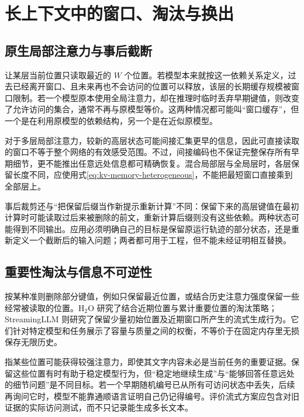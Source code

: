 \documentclass[UTF8,12pt,a4paper,fontset=fandol]{ctexart}
\begin{document}
\section{长上下文中的窗口、淘汰与换出}
\label{sec:kv-long-context}

\subsection{原生局部注意力与事后截断}

让某层当前位置只读取最近的 $W$ 个位置。若模型本来就按这一依赖关系定义，过去已经离开窗口、且未来再也不会访问的位置可以释放，该层的长期缓存规模被窗口限制。若一个模型原本使用全局注意力，却在推理时临时丢弃早期键值，则改变了允许访问的集合，通常不再与原模型等价。这两种情况都可能叫“窗口缓存”，但一个是在利用原模型的依赖结构，另一个是在近似原模型。

对于多层局部注意力，较新的高层状态可能间接汇集更早的信息，因此可直接读取的窗口不等于整个网络的有效感受范围。不过，间接编码也不保证完整保存所有早期细节，更不能推出任意远处信息都可精确恢复。混合局部层与全局层时，各层保留长度不同，应使用式\eqref{eq:kv-memory-heterogeneous}，不能把最短窗口直接乘到全部层上。

事后裁剪还与“把保留后缀当作新提示重新计算”不同：保留下来的高层键值在最初计算时可能读取过后来被删除的前文，重新计算后缀则没有这些依赖。两种状态可能得到不同输出。应用必须明确自己的目标是保留原运行轨迹的部分状态，还是重新定义一个截断后的输入问题；两者都可用于工程，但不能未经证明相互替换。

\subsection{重要性淘汰与信息不可逆性}

按某种准则删除部分键值，例如只保留最近位置，或结合历史注意力强度保留一些经常被读取的位置。H$_2$O 研究了结合近期位置与累计重要位置的淘汰策略\cite{h2o}；StreamingLLM 则研究了保留少量初始位置及近期窗口所产生的流式生成行为\cite{streaming}。它们针对特定模型和任务展示了容量与质量之间的权衡，不等价于在固定内存里无损保存无限历史。

指某些位置可能获得较强注意力，即使其文字内容未必是当前任务的重要证据。保留这些位置有时有助于稳定模型行为，但“稳定地继续生成”与“能够回答任意远处的细节问题”是不同目标。若一个早期随机编号已从所有可访问状态中丢失，后续再询问它时，模型不能靠通顺语言证明自己仍记得编号。评价流式方案应包含对旧证据的实际访问测试，而不只记录能生成多长文本。
\end{document}
